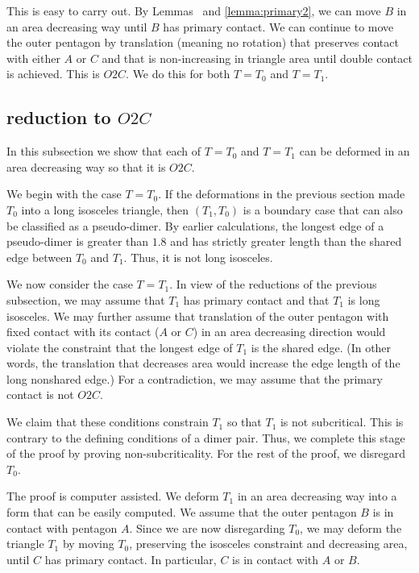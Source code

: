 This is easy to carry out.  By Lemmas~ and
\ref{lemma:primary2}, we can move $B$ in an area decreasing way until
$B$ has primary contact.  We can continue to move the outer pentagon
by translation (meaning no rotation) that preserves contact with
either $A$ or $C$ and that is non-increasing in triangle area until
double contact is achieved.  This is $O2C$.  We do this for both
$T=T_0$ and $T=T_1$.

\subsection{reduction to $O2C$}

In this subsection we show that each of $T=T_0$ and $T=T_1$ can be
deformed in an area decreasing way so that it is $O2C$.

We begin with the case $T=T_0$.  If the deformations in the previous
section made $T_0$ into a long isosceles triangle, then $(T_1,T_0)$ is
a boundary case that can also be classified as a pseudo-dimer.  By
earlier calculations, the longest edge of a pseudo-dimer is greater
than $1.8$ and has strictly greater length than the shared edge
between $T_0$ and $T_1$.  Thus, it is not long isosceles.

We now consider the case $T=T_1$.  In view of the reductions of the
previous subsection, we may assume that $T_1$ has primary contact and
that $T_1$ is long isosceles.  We may further assume that translation
of the outer pentagon with fixed contact with its contact ($A$ or $C$)
in an area decreasing direction would violate the constraint that the
longest edge of $T_1$ is the shared edge.  (In other words, the
translation that decreases area would increase the edge length of the
long nonshared edge.)  For a contradiction, we may assume that the
primary contact is not $O2C$.

We claim that these conditions constrain $T_1$ so that $T_1$ is not
subcritical.  This is contrary to the defining conditions of a dimer
pair.  Thus, we complete this stage of the proof by proving
non-subcriticality. For the rest of the proof, we disregard $T_0$.

The proof is computer assisted.  We deform $T_1$ in an area decreasing
way into a form that can be easily computed.  We assume that the outer
pentagon $B$ is in contact with pentagon $A$.  Since we are now
disregarding $T_0$, we may deform the triangle $T_1$ by moving $T_0$,
preserving the isosceles constraint and decreasing area, until $C$ has
primary contact.  In particular, $C$ is in contact with $A$ or $B$.

